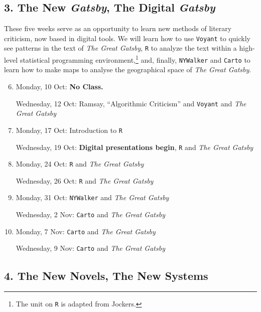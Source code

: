 \subsection*{3. The New \textit{Gatsby}, The Digital \textit{Gatsby}}

  These five weeks serve as an opportunity to learn new methods of literary
  criticism, now based in digital tools. We will learn how to use
  \texttt{Voyant} to quickly see patterns in the text of \textit{The Great
    Gatsby}, \texttt{R} to analyze the text within a high-level statistical
  programming environment,\footnote{The unit on \texttt{R} is adapted from
    Jockers.} and, finally, \texttt{NYWalker} and \texttt{Carto} to learn how
  to make maps to analyse the geographical space of \textit{The Great Gatsby}.

\begin{enumerate}
  \setcounter{enumi}{5}
 
  \item Monday, 10 Oct: \textbf{No Class.}

    Wednesday, 12 Oct: Ramsay, “Algorithmic Criticism” and \texttt{Voyant} and
    \textit{The Great Gatsby}
  
  \item Monday, 17 Oct: Introduction to \texttt{R}

    Wednesday, 19 Oct: \textbf{\small Digital presentations begin}, \texttt{R} and \textit{The Great Gatsby}

  \item Monday, 24 Oct: \texttt{R} and \textit{The Great Gatsby}

    Wednesday,  26 Oct: \texttt{R} and \textit{The Great Gatsby}

  \item Monday, 31 Oct: \texttt{NYWalker} and \textit{The Great Gatsby}

    Wednesday, 2 Nov: \texttt{Carto} and \textit{The Great Gatsby}

  \item Monday, 7 Nov: \texttt{Carto} and \textit{The Great Gatsby}

    Wednesday, 9 Nov: \texttt{Carto} and \textit{The Great Gatsby}

\end{enumerate}

\subsection*{4. The New Novels, The New Systems}

